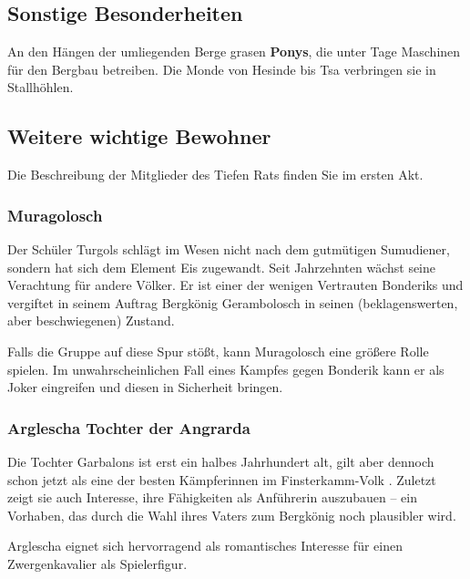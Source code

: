 \documentclass[openright]{Ilaris}
\newcommand{\fkv}{Finsterkamm-Volk }
\begin{document}
\subsection{Sonstige Besonderheiten}
An den Hängen der umliegenden Berge grasen \textbf{Ponys}, die unter Tage Maschinen für den Bergbau betreiben. Die Monde von Hesinde bis Tsa verbringen sie in Stallhöhlen.


\subsection{Weitere wichtige Bewohner}

Die Beschreibung der Mitglieder des Tiefen Rats finden Sie im ersten Akt. 

\subsubsection{Muragolosch}
Der Schüler Turgols schlägt im Wesen nicht nach dem gutmütigen Sumudiener, sondern hat sich dem Element Eis zugewandt.
Seit Jahrzehnten wächst seine Verachtung für andere Völker.
Er ist einer der wenigen Vertrauten Bonderiks und vergiftet in seinem Auftrag Bergkönig Gerambolosch in seinen (beklagenswerten, aber beschwiegenen) Zustand.

Falls die Gruppe auf diese Spur stößt, kann Muragolosch eine größere Rolle spielen. Im unwahrscheinlichen Fall eines Kampfes gegen Bonderik kann er als Joker eingreifen und diesen in Sicherheit bringen.

\subsubsection{Arglescha Tochter der Angrarda}
Die Tochter Garbalons ist erst ein halbes Jahrhundert alt, gilt aber dennoch schon jetzt als eine der besten Kämpferinnen im \fkv.
Zuletzt zeigt sie auch Interesse, ihre Fähigkeiten als Anführerin auszubauen -- ein Vorhaben, das durch die Wahl ihres Vaters zum Bergkönig noch plausibler wird.

Arglescha eignet sich hervorragend als romantisches Interesse für einen Zwergenkavalier als Spielerfigur.

\end{document}
